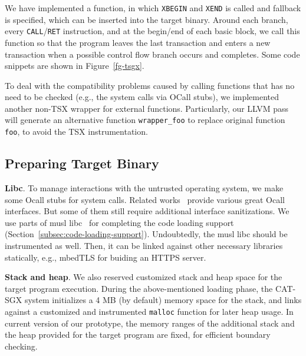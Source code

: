We have implemented a function, in which \texttt{XBEGIN} and \texttt{XEND} is called and fallback is specified, which can be inserted into the target binary. Around each branch, every \texttt{CALL}/\texttt{RET} instruction, and at the begin/end of each basic block, we call this function so that the program leaves the last transaction and enters a new transaction when a possible control flow branch occurs and completes. Some code snippets are shown in Figure~\ref{fg-tsgx}. 

To deal with the compatibility problems caused by calling functions that has no need to be checked (e.g., the system calls via OCall stubs), we implemented another non-TSX wrapper for external functions.
Particularly, our LLVM pass will generate an alternative function \verb|wrapper_foo| to replace original function \verb|foo|, to avoid the TSX instrumentation.



\subsection{Preparing Target Binary}\label{appendix-preparing}

\vspace{3pt}\noindent\textbf{Libc}. To manage interactions with the untrusted operating system, we make some Ocall stubs for system calls. 
Related works~\cite{shinde2017panoply,tsai2017graphene,priebe2019sgx,shinde2020besfs} provide various great Ocall interfaces. But some of them still require additional interface sanitizations.
We use parts of musl libc~\cite{musllibc} for completing the code loading support (Section~\ref{subsec:code-loading-support}).
Undoubtedly, the musl libc should be instrumented as well. Then, it can be linked against other necessary libraries statically, e.g., mbedTLS for buiding an HTTPS server.

\vspace{3pt}\noindent\textbf{Stack and heap}. We also reserved customized stack and heap space for the target program execution. During the above-mentioned loading phase, the CAT-SGX system initializes a 4 MB (by default) memory space for the stack, and links against a customized and instrumented \verb|malloc| function for later heap usage. In current version of our prototype, the memory ranges of the additional stack and the heap provided for the target program are fixed, for efficient boundary checking.

